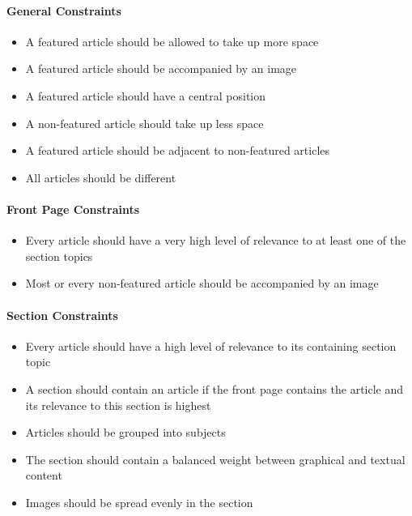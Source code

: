 \paragraph{General Constraints}
\label{sec:analysis_mix}
\begin{itemize}\itemdist
	\item A featured article should be allowed to take up more space
	\item A featured article should be accompanied by an image
	\item A featured article should have a central position
	\item A non-featured article should take up less space
	\item A featured article should be adjacent to non-featured articles
	\item All articles should be different
\end{itemize}

\paragraph{Front Page Constraints}
\begin{itemize}\itemdist
	\item Every article should have a very high level of relevance to at least one of the section topics
	\item Most or every non-featured article should be accompanied by an image
\end{itemize}

\paragraph{Section Constraints}
\begin{itemize}\itemdist
	\item Every article should have a high level of relevance to its containing section topic
	\item A section should contain an article if the front page contains the article and its relevance to this section is highest
	\item Articles should be grouped into subjects
	\item The section should contain a balanced weight between graphical and textual content
	\item Images should be spread evenly in the section
\end{itemize}

